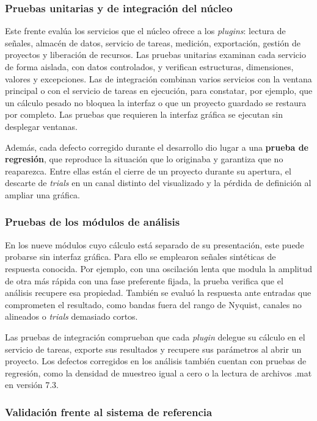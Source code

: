 \documentclass[12pt,letterpaper,oneside]{article}
\begin{document}
\subsubsection{Pruebas unitarias y de integración del núcleo}

Este frente evalúa los servicios que el núcleo ofrece a los \textit{plugins}: lectura de señales, almacén de datos, servicio de tareas, medición, exportación, gestión de proyectos y liberación de recursos. Las pruebas unitarias examinan cada servicio de forma aislada, con datos controlados, y verifican estructuras, dimensiones, valores y excepciones. Las de integración combinan varios servicios con la ventana principal o con el servicio de tareas en ejecución, para constatar, por ejemplo, que un cálculo pesado no bloquea la interfaz o que un proyecto guardado se restaura por completo. Las pruebas que requieren la interfaz gráfica se ejecutan sin desplegar ventanas.

Además, cada defecto corregido durante el desarrollo dio lugar a una \textbf{prueba de regresión}, que reproduce la situación que lo originaba y garantiza que no reaparezca. Entre ellas están el cierre de un proyecto durante su apertura, el descarte de \textit{trials} en un canal distinto del visualizado y la pérdida de definición al ampliar una gráfica.

\subsubsection{Pruebas de los módulos de análisis}

En los nueve módulos cuyo cálculo está separado de su presentación, este puede probarse sin interfaz gráfica. Para ello se emplearon señales sintéticas de respuesta conocida. Por ejemplo, con una oscilación lenta que modula la amplitud de otra más rápida con una fase preferente fijada, la prueba verifica que el análisis recupere esa propiedad. También se evaluó la respuesta ante entradas que comprometen el resultado, como bandas fuera del rango de Nyquist, canales no alineados o \textit{trials} demasiado cortos.

Las pruebas de integración comprueban que cada \textit{plugin} delegue su cálculo en el servicio de tareas, exporte sus resultados y recupere sus parámetros al abrir un proyecto. Los defectos corregidos en los análisis también cuentan con pruebas de regresión, como la densidad de muestreo igual a cero o la lectura de archivos .mat en versión 7.3.

\subsubsection{Validación frente al sistema de referencia}
\end{document}
